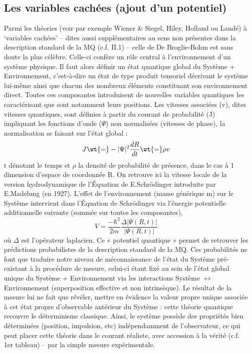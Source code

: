 \subsection{Les variables cachées (ajout d’un potentiel)}
Parmi les théories (voir par exemple Wiener \& Siegel, Hiley, Holland ou Landé) à ‘variables
cachées’ – dites aussi supplémentaires au sens non présentes dans la description standard de
la MQ (c.f. II.1) – celle de De Broglie-Bohm est sans doute la plus célèbre. Celle-ci confère
un rôle central à l’environnement d’un système physique. Il faut alors définir un état
quantique global du Système + Environnement, c’est-à-dire un état de type produit tensoriel
décrivant le système lui-même ainsi que chacun des nombreux éléments constituant son
environnement direct. Toutes ces composantes introduisent de nouvelles variables
quantiques les caractérisant que sont notamment leurs positions. Les vitesses associées (v),
dites vitesses quantiques, sont définies à partir du courant de probabilité (J) impliquant les
fonctions d’onde ($\Psi$) non normalisées (vitesses de phase), la normalisation se faisant sur
l’état global :
\[
J\wt{=}-|\Psi|^2\frac{dR}{dt}\wt{=}\rho v
\]
t dénotant le temps et $\rho$ la densité de probabilité de présence, dans le cas à 1 dimension
d’espace de coordonnée R. On retrouve ici la vitesse locale de la version hydrodynamique
de l’Équation de E.Schrödinger introduite par E.Madelung (en 1927). L’effet de
l’environnement (masse générique m) sur le Système intervient dans l’Équation de
Schrödinger via l’énergie potentielle additionnelle suivante (sommée sur toutes les
composantes),
\[
V=\frac{-\hbar^2}{2m}\frac{\Delta|\Psi(R,t)|}{|\Psi(R,t)|}
\]
où $\Delta$ est l’opérateur laplacien. Ce « potentiel quantique » permet de retrouver les
prédictions probabilistes de la description standard de la MQ. Ces probabilités ne font que
traduire notre niveau de méconnaissance de l’état du Système pré-existant à la procédure de
mesure, celui-ci étant fixé au sein de l’état global unique du Système + Environnement via
les interactions Système $\leftrightarrow$ Environnement (superposition effective et non
 intrinsèque). Le
résultat de la mesure lui ne fait que révéler, mettre en évidence la valeur propre unique
associée à cet état propre d’observable antérieur du Système : cette théorie quantique
recouvre le déterminisme classique. Ainsi, le système possède des propriétés bien
déterminées (position, impulsion, etc) indépendamment de l’observateur, ce qui peut placer
cette théorie dans le courant réaliste, avec accession à la vérité (c.f. 1er tableau) – par la
simple mesure expérimentale.
